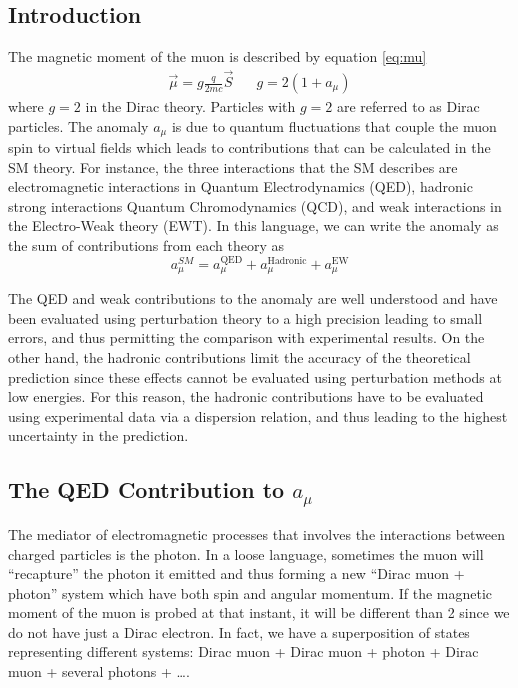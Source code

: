 \documentclass{outhesis}
\begin{document}
\subsection{Introduction}
The magnetic moment of the muon is described by equation \ref{eq:mu}
\begin{equation}
\begin{split}
\overrightarrow{\mu} = g\frac{q}{2mc}\overrightarrow{S} \,\,\,\,\,\,\,\,\,\,  g = 2\left(1+a_{\mu}\right)
\label{mug}
\end{split}
\end{equation}
where $g=2$ in the Dirac theory. Particles with $g=2$ are referred to as Dirac particles. The anomaly $a_{\mu}$ is due to quantum fluctuations that couple the muon spin to virtual fields which leads to contributions that can be calculated in the SM theory. For instance, the three interactions that the SM describes are electromagnetic interactions in Quantum Electrodynamics (QED), hadronic strong interactions Quantum Chromodynamics (QCD), and weak interactions in the Electro-Weak theory (EWT). In this language, we can write the anomaly as the sum of contributions from each theory as
\begin{equation}
a_{\mu}^{SM} = a_{\mu}^{\text{QED}}+a_{\mu}^{\text{Hadronic}}+a_{\mu}^{\text{EW}}
\label{eq:asm}
\end{equation}

The QED and weak contributions to the anomaly are well understood and have been evaluated using perturbation theory to a high precision leading to small errors, and thus permitting the comparison with experimental results. On the other hand, the hadronic contributions limit the accuracy of the theoretical prediction since these effects cannot be evaluated using perturbation methods at low energies. For this reason, the hadronic contributions have to be evaluated using experimental data via a dispersion relation, and thus leading to the highest uncertainty in the prediction.

\subsection{The QED Contribution to $a_{\mu}$}

The mediator of electromagnetic processes that involves the interactions between charged particles is the photon. In a loose language, sometimes the muon will ``recapture'' the photon it emitted and thus forming a new ``Dirac muon + photon'' system which have both spin and angular momentum. %
If the magnetic moment of the muon is probed at that instant, it will be different than 2 since we do not have just a Dirac electron. In fact, we have a superposition of states representing different systems: Dirac muon + {Dirac muon + photon} + {Dirac muon + several photons} + \ldots.
\end{document}
